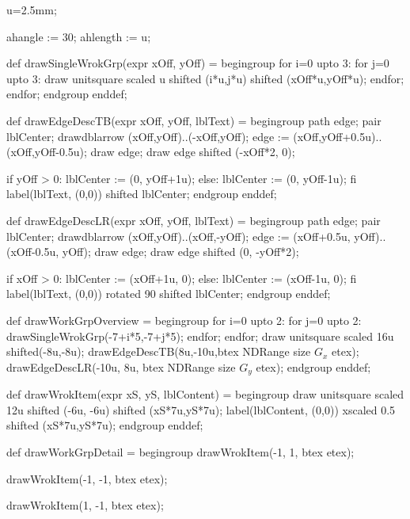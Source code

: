 \startMPinclusions
u=2.5mm;

ahangle := 30;
ahlength := u;
\stopMPinclusions

def drawSingleWrokGrp(expr xOff, yOff) =
begingroup
for i=0 upto 3:
	for j=0 upto 3:
		draw unitsquare scaled u shifted (i*u,j*u) shifted (xOff*u,yOff*u);
	endfor;
endfor;
endgroup
enddef;

def drawEdgeDescTB(expr xOff, yOff, lblText) =
begingroup
path edge;
pair lblCenter;
drawdblarrow (xOff,yOff)..(-xOff,yOff);
edge := (xOff,yOff+0.5u)..(xOff,yOff-0.5u);
draw edge;
draw edge shifted (-xOff*2, 0);

if yOff > 0:
lblCenter := (0, yOff+1u);
else:
lblCenter := (0, yOff-1u);
fi
label(lblText, (0,0)) shifted lblCenter;
endgroup
enddef;

def drawEdgeDescLR(expr xOff, yOff, lblText) =
begingroup
path edge;
pair lblCenter;
drawdblarrow (xOff,yOff)..(xOff,-yOff);
edge := (xOff+0.5u, yOff)..(xOff-0.5u, yOff);
draw edge;
draw edge shifted (0, -yOff*2);

if xOff > 0:
lblCenter := (xOff+1u, 0);
else:
lblCenter := (xOff-1u, 0);
fi
label(lblText, (0,0)) rotated 90 shifted lblCenter;
endgroup
enddef;

def drawWorkGrpOverview =
begingroup
for i=0 upto 2:
	for j=0 upto 2:
		drawSingleWrokGrp(-7+i*5,-7+j*5);
	endfor;
endfor;
draw unitsquare scaled 16u shifted(-8u,-8u);
drawEdgeDescTB(8u,-10u,btex NDRange size $G_x$ etex);
drawEdgeDescLR(-10u, 8u, btex NDRange size $G_y$ etex);
endgroup
enddef;

def drawWrokItem(expr xS, yS, lblContent) =
begingroup
draw unitsquare scaled 12u shifted (-6u, -6u) shifted (xS*7u,yS*7u);
label(lblContent, (0,0)) xscaled 0.5 shifted (xS*7u,yS*7u);
endgroup
enddef;

def drawWorkGrpDetail =
begingroup
drawWrokItem(-1, 1, btex  etex);

drawWrokItem(-1, -1, btex  etex);

drawWrokItem(1, -1, btex  etex);

